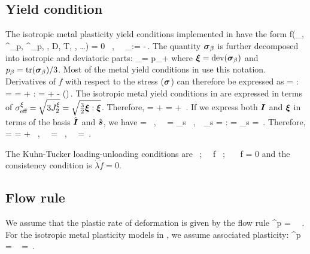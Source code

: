 \subsection{Yield condition}
The isotropic metal plasticity yield conditions implemented in \Vaango have the form
\Beq
  f(\Bsig_\beta, \Veps^\Teq_p, \dot{\Veps}^\Teq_p, \phi, D, T, \Edot{\Teq}, \dots) = 0 ~,~~
  \Bsig_\beta := \Bsig-\Bbeta \,.
\Eeq
The quantity $\boldsymbol{\sigma}_\beta$ is further decomposed into isotropic and deviatoric parts:
\Beq
  \Bsig_\beta = p_\beta \BI + \Bxi
\Eeq
where $\boldsymbol{\xi} = \text{dev}(\boldsymbol{\sigma}_\beta)$ and $p_\beta = \text{tr}(\boldsymbol{\sigma}_\beta)/3$.  Most of the metal yield
conditions in \Vaango use this notation.
Derivatives of $f$ with respect to the stress ($\boldsymbol{\sigma}$) can therefore be expressed as
\Beq
   = :\Partial{\Bsig_\beta}{\Bsig} = 
    =  + :\Partial{\Bxi}{\Bsig_\beta} 
    =   \BI +  -  \Tr\left(\right)\BI\,.
\Eeq
The isotropic metal yield conditions in \Vaango are expressed in terms of
$\sigma_{\text{eff}}^\xi = \sqrt{3 J_2^\xi} = \sqrt{\tfrac{3}{2} \boldsymbol{\xi}:\boldsymbol{\xi}}$.
Therefore,
\Beq
   = 
      \BI +  \Partial{\sigma_\Teff^\xi}{\Bxi}
   =   \BI + 
       \frac{\Bxi}{\Norm{\Bxi}{}}\,.
\Eeq
If we express both $\boldsymbol{I}$ and $\boldsymbol{\xi}$ in terms of the basis $\hat{\boldsymbol{I}}$ and $\hat{\boldsymbol{s}}$, we have
\Beq
  \BI =  \hat{\BI} ~,~~ \Bxi = \xi_s \hat{\BsT}~,~~\xi_s = \Bxi:\hat{\BsT}
  \quad \Tand \quad \Norm{\Bxi}{} = \xi_s
  \quad \implies \quad \frac{\Bxi}{\Norm{\Bxi}{}} = \hat{\BsT} \,.
\Eeq
Therefore,
\Beq \label{eq:N_df_dsig}
  \BN =  = 
      \hat{\BI} + 
      \hat{\BsT} ~,~~
  \Norm{\BN}{} =  ~,~~
  \hat{\BN} = \frac{\BN}{\Norm{\BN}{}} \,.
\Eeq

The Kuhn-Tucker loading-unloading conditions are
\Beq
  \dot{\lambda}  ~;~~  f  ~;~~ \dot{\lambda}~f = 0
\Eeq
and the consistency condition is $\dot{\lambda}\dot{f} = 0$.

\subsection{Flow rule}
We assume that the plastic rate of deformation is given by the flow rule
\Beq
  \dot{\BVeps}^p = \dot{\lambda}~\hat{\BM} \,.
\Eeq
For the isotropic metal plasticity models in \Vaango, we assume associated plasticity:
\Beq
  \dot{\BVeps}^p = \dot{\lambda}~\hat{\BN}
    = \frac{\dot{\lambda}}{\Norm{\BN}{}}
    \,.
\Eeq

